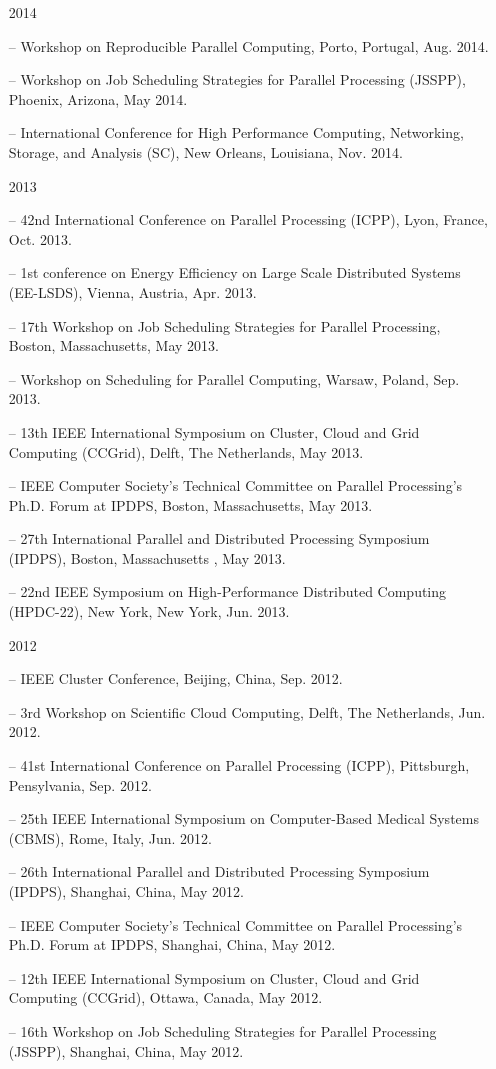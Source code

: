 \documentclass[times,11pt]{letter}
\begin{document}
\begin{itemize}
\item [2014]
\item[--]  Workshop on Reproducible Parallel Computing, Porto, Portugal,
Aug. 2014.
\item[--]  Workshop on Job Scheduling Strategies for Parallel Processing (JSSPP), Phoenix, Arizona, May 2014.
\item[--]  International Conference for High Performance Computing, Networking, Storage, and Analysis (SC), New Orleans, Louisiana, Nov. 2014.

\item [2013]
\item[--] 42nd International Conference on Parallel Processing (ICPP),  Lyon, France, Oct. 2013.
\item[--] 1st conference on Energy Efficiency on Large Scale Distributed Systems (EE-LSDS), Vienna, Austria, Apr. 2013.
\item[--] 17th Workshop on Job Scheduling Strategies for Parallel Processing, Boston, Massachusetts, May 2013.
\item[--] Workshop on Scheduling for Parallel Computing, Warsaw, Poland, Sep. 2013.
\item[--]  13th IEEE International Symposium on Cluster, Cloud and Grid
Computing (CCGrid), Delft, The Netherlands, May 2013.
\item[--]  IEEE Computer Society's Technical Committee on Parallel Processing's Ph.D. Forum at IPDPS, Boston, Massachusetts, May 2013.
\item[--]  27th International Parallel and Distributed Processing Symposium (IPDPS), Boston, Massachusetts , May 2013.
\item[--]  22nd IEEE Symposium on High-Performance Distributed Computing (HPDC-22), New York, New York, Jun. 2013. 

\item [2012]
\item[--]  IEEE Cluster Conference, Beijing, China, Sep. 2012.
\item[--]  3rd Workshop on Scientific Cloud Computing, Delft, The Netherlands, Jun. 2012.
\item[--]  41st  International Conference on Parallel Processing  (ICPP), Pittsburgh, Pensylvania, Sep. 2012.
\item[--]   25th IEEE International Symposium on Computer-Based Medical Systems (CBMS), Rome, Italy, Jun. 2012.
\item[--]  26th International Parallel and Distributed Processing Symposium (IPDPS), Shanghai, China, May 2012.
\item[--]  IEEE Computer Society's Technical Committee on Parallel Processing's Ph.D. Forum at IPDPS, Shanghai, China, May 2012.
\item[--]  12th IEEE International Symposium on Cluster, Cloud and Grid
Computing (CCGrid), Ottawa, Canada, May 2012.
\item[--]  16th Workshop on Job Scheduling Strategies for Parallel Processing (JSSPP),  Shanghai, China, May 2012.


\end{itemize}
\end{document}

